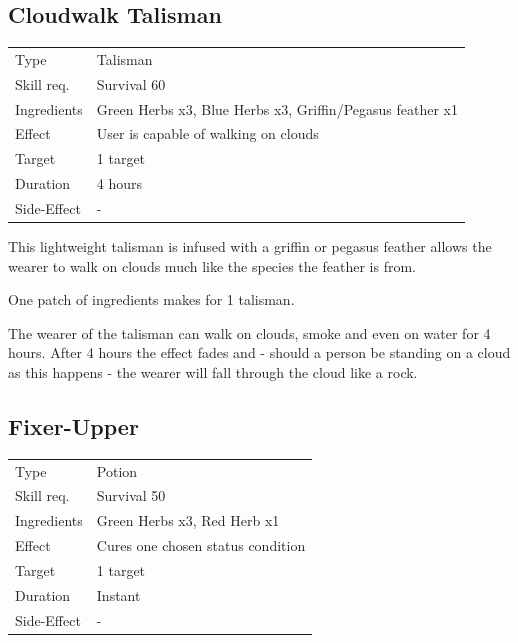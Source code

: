 \documentclass[11pt,a4paper,twocolumn]{book}
\begin{document}
\subsection*{Cloudwalk Talisman}
{
	\begin{tabu} to 75mm{| X[l,4] | X[l,8] |}
		\hline
		Type 			& Talisman 													\\
        Skill req.	    & Survival 60 												\\
        Ingredients     & Green Herbs x3, Blue Herbs x3, Griffin/Pegasus feather x1	\\
        Effect     		& User is capable of walking on clouds 						\\
        Target      	& 1 target													\\
        Duration  		& 4 hours	 												\\
        Side-Effect     & -															\\ \hline
	\end{tabu}
		
}

\medskip

This lightweight talisman is infused with a griffin or pegasus feather allows the wearer to walk on clouds much like the species the feather is from.

One patch of ingredients makes for 1 talisman.

The wearer of the talisman can walk on clouds, smoke and even on water for 4 hours. After 4 hours the effect fades and - should a person be standing on a cloud as this happens - the wearer will fall through the cloud like a rock.

\vfill


\subsection*{Fixer-Upper}
{
	\begin{tabu} to 75mm{| X[l,4] | X[l,8] |}
		\hline
		Type 			& Potion													\\
        Skill req.	    & Survival 50 												\\
        Ingredients     & Green Herbs x3, Red Herb x1								\\
        Effect     		& Cures one chosen status condition 						\\
        Target      	& 1 target													\\
        Duration  		& Instant	 												\\
        Side-Effect     & -															\\ \hline
	\end{tabu}
		
}
\end{document}
